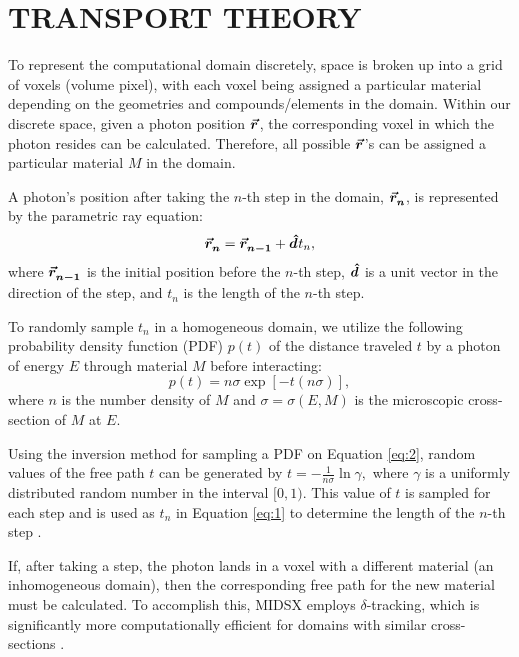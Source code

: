 \section{TRANSPORT THEORY}
\par To represent the computational domain discretely, space is broken up into a grid of voxels (volume pixel), with each voxel being assigned a particular material depending on the geometries and compounds/elements in the domain. Within our discrete space, given a photon position $\bm{\vec{r}_{}^{}}$, the corresponding voxel in which the photon resides can be calculated. Therefore, all possible $\bm{\vec{r}_{}^{}}$'s can be assigned a particular material $M$ in the domain.

\par A photon's position after taking the $n$-th step in the domain, $\bm{\vec{r}_{n}^{}}$, is represented by the parametric ray equation:
\begin{equation} \label{eq:1}
    \bm{\vec{r}_{n}^{}} = \bm{\vec{r}_{n-1}^{}} + \bm{\hat{d}_{}^{}} t_n,
\end{equation}
where $\bm{\vec{r}_{n-1}^{}}$ is the initial position before the $n$-th step, $\bm{\hat{d}_{}^{}}$ is a unit vector in the direction of the step, and $t_n$ is the length of the $n$-th step.

\par To randomly sample $t_n$ in a homogeneous domain, we utilize the following probability density function (PDF) $p(t)$ of the distance traveled $t$ by a photon of energy $E$ through material $M$ before interacting:
\begin{equation} \label{eq:2}
    p(t) = n\sigma \exp{\left[-t(n\sigma)\right]},
\end{equation}
where $n$ is the number density of $M$ and $\sigma = \sigma(E, M)$ is the microscopic cross-section of $M$ at $E$.
\par Using the inversion method for sampling a PDF on Equation \ref{eq:2}, random values of the free path $t$ can be generated by $
    t = -\frac{1}{n\sigma} \ln \gamma, 
    $
where $\gamma$ is a uniformly distributed random number in the interval $[0, 1)$. This value of $t$ is sampled for each step and is used as $t_n$ in Equation \ref{eq:1} to determine the length of the $n$-th step .
\par If, after taking a step, the photon lands in a voxel with a different material (an inhomogeneous domain), then the corresponding free path for the new material must be calculated. To accomplish this, MIDSX employs $\delta$-tracking, which is significantly more computationally efficient for domains with similar cross-sections .


